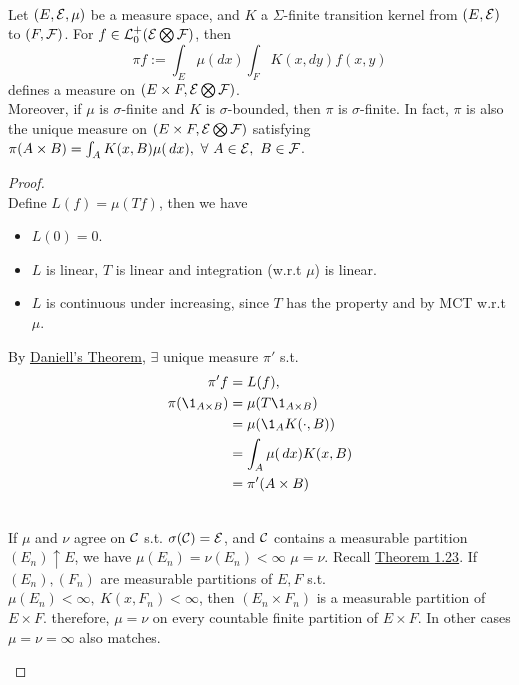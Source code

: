 \vspace{6pt}
\begin{proposition}\ \\
Let $(E,\mathcal{E},\mu)$ be a measure space, and $K$ a $\Sigma$-finite transition kernel from $(E,\mathcal{E})$ to $(F,\mathcal{F})$. For $f \in \mathcal{L}_0^+(\mathcal{E} \bigotimes \mathcal{F})$, then
\begin{equation*}
    \pi f := \int_E \mu(dx) \int_F K(x,dy) f(x,y)
\end{equation*}
defines a measure on $(E\times F, \mathcal{E} \bigotimes \mathcal{F} )$.\\
Moreover, if $\mu$ is $\sigma$-finite and $K$ is $\sigma$-bounded, then $\pi$ is $\sigma$-finite. In fact, $\pi$ is also the unique measure on $(E \times F, \mathcal{E} \bigotimes \mathcal{F})$ satisfying $\pi(A \times B) = \int_A K(x,B) \mu(\,dx),\ \forall\ A \in \mathcal{E},\ B \in \mathcal{F}$.
\end{proposition}
\begin{proof}\ \\
Define $L(f) = \mu(Tf)$, then we have
\begin{itemize}
    \item $L(0) = 0$.
    \item $L$ is linear, $T$ is linear and integration (w.r.t $\mu$) is linear.
    \item $L$ is continuous under increasing, since $T$ has the property and by MCT w.r.t $\mu$.
\end{itemize}
By \hyperref[Daniell's theorem]{Daniell's Theorem}, $\exists$ unique measure $\pi'$ s.t.
\begin{align*}
    \pi' f &= L(f),\\
    \pi(\1_{A \times B}) &= \mu(T \1_{A \times B})\\
    &= \mu(\1_A K(\cdot, B))\\
    &= \int_A \mu(\dr x) K(x,B)\\
    &= \pi'(A \times B)
\end{align*}
\begin{remark}[uniqueness]\ \\
If $\mu$ and $\nu$ agree on $\mathcal{C}$ s.t. $\sigma(\mathcal{C}) = \mathcal{E}$, and $\mathcal{C}$ contains a measurable partition $(E_n) \uparrow E$, we have $\mu(E_n) = \nu(E_n) < \infty$ \imply $\mu = \nu$. Recall \hyperref[1.23]{Theorem 1.23}. If $(E_n), (F_n)$ are measurable partitions of $E,F$ s.t. $\mu(E_n) < \infty,\ K(x,F_n) < \infty$, then $(E_n \times F_n)$ is a measurable partition of $E \times F$. therefore, $\mu =\nu$ on every countable finite partition of $E \times F$. In other cases $\mu = \nu = \infty$ also matches.
\end{remark}
\end{proof}



